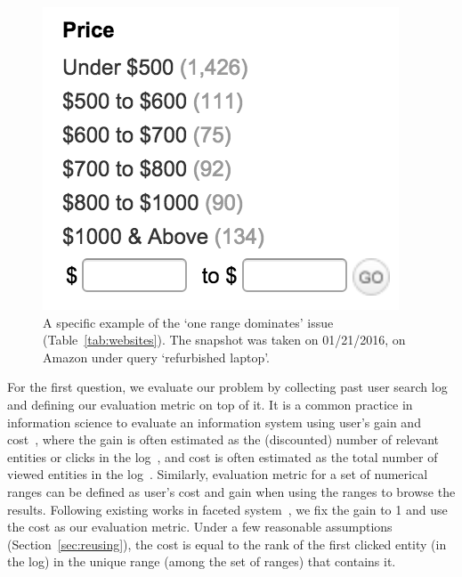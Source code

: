 \begin{figure}
\centering
\includegraphics[scale=0.5]{./figure/chapter3//refurbish.png}
\caption{A specific example of the `one range dominates' issue (Table~\ref{tab:websites}). The snapshot was taken on 01/21/2016, on Amazon under query `refurbished laptop'.\label{fig:intro_example_3}}
\vspace{-0.2in}
\end{figure}

For the first question, we evaluate our problem by collecting past user search log and defining our evaluation metric on top of it. It is a common practice in information science to evaluate an information system using user's gain and cost~\cite{card:1999,conf/sigir/Azzopardi14,conf/cikm/YilmazVCRB14}, where the gain is often estimated as the (discounted) number of relevant entities or clicks in the log~\cite{journals/tois/MoffatZ08}, and cost is often estimated as the total number of viewed entities in the log~\cite{Liberman:2012:AOF:2245276.2245409}. Similarly, evaluation metric for a set of numerical ranges can be defined as user's cost and gain when using the ranges to browse the results. Following existing works in faceted system~\cite{Liberman:2012:AOF:2245276.2245409}, we fix the gain to 1 and use the cost as our evaluation metric. Under a few reasonable assumptions (Section~\ref{sec:reusing}), the cost is equal to the rank of the first clicked entity (in the log) in the unique range (among the set of ranges) that contains it. 


